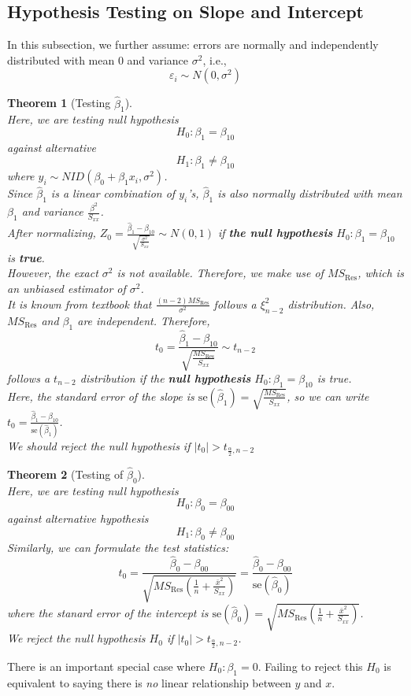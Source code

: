 \documentclass[12pt]{article}
\newcommand{\se}{\mathrm{se}}
\newtheorem{theorem}{Theorem}[section]
\theoremstyle{definition}
\begin{document}
\subsection{Hypothesis Testing on Slope and Intercept}
In this subsection, we further assume: errors are normally and independently distributed with mean $0$ and variance $\sigma^2$, i.e.,
\[
\varepsilon_i\sim N(0,\sigma^2)
\]
\begin{theorem}[Testing {$\hat{\beta}_1$}]
\hfill\\\normalfont Here, we are testing null hypothesis
\[
H_0:\beta_1= \beta_{10}
\]
against alternative
\[
H_1: \beta_1\neq \beta_{10}
\]
where $y_i\sim NID(\beta_0 + \beta_1x_i, \sigma^2)$.\\
Since $\hat{\beta}_1$ is a linear combination of $y_i$'s, $\hat{\beta}_1$ is also normally distributed with mean $\beta_1$ and variance $\frac{\beta^2}{S_{xx}}$.\\ After normalizing, $Z_0 = \frac{\hat{\beta}_1-\beta_{10}}{\sqrt{\frac{\sigma^2}{S_{xx}}}}\sim N(0,1)$ if \textbf{the null hypothesis} $H_0:\beta_1 = \beta_{10}$ is \textbf{true}.\\

However, the exact $\sigma^2$ is not available. Therefore, we make use of $MS_\text{Res}$, which is an unbiased estimator of $\sigma^2$.\\
It is known \textit{from textbook} that $\frac{(n-2)MS_\text{Res}}{\sigma^2}$ follows a $\xi_{n-2}^2$ distribution. Also, $MS_\text{Res}$ and $\beta_1$ are independent. Therefore,
\[
t_0=\frac{\hat{\beta}_1-\beta_{10}}{\sqrt{\frac{MS_\text{Res}}{S_{xx}}}}\sim t_{n-2}
\]
follows a $t_{n-2}$ distribution if the \textbf{null hypothesis} $H_0: \beta_1 = \beta_{10}$ is true.\\
Here, the standard error of the slope is $\se(\hat{\beta}_1)=\sqrt{\frac{MS_\text{Res}}{S_{xx}}}$, so we can write $t_0 = \frac{\hat{\beta}_1-\beta_{10}}{\se(\hat{\beta}_1)}$.\\
We should reject the null hypothesis if $|t_0|> t_{\frac{\alpha}{2}, n-2}$
\end{theorem}
\begin{theorem}[Testing of {$\hat{\beta}_0$}]
\hfill\\\normalfont Here, we are testing null hypothesis 
\[
H_0: \beta_0 = \beta_{00}
\]
against alternative hypothesis
\[
H_1: \beta_0 \neq \beta_{00}
\]
Similarly, we can formulate the test statistics:
\[
t_0 = \frac{\hat{\beta}_0-\beta_{00}}{\sqrt{MS_\text{Res}(\frac{1}{n}+\frac{\bar{x}^2}{S_{xx}})}} = \frac{\hat{\beta}_0-\beta_{00}}{\se(\hat{\beta}_0)}
\]
where the stanard error of the intercept is $\se(\hat{\beta}_0) = \sqrt{MS_\text{Res}(\frac{1}{n}+\frac{\bar{x}^2}{S_{xx}})}$.\\
We reject the null hypothesis $H_0$ if $|t_0|> t_{\frac{\alpha}{2}, n-2}$.
\end{theorem}
There is an important special case where $H_0: \beta_1 = 0$. Failing to reject this $H_0$ is equivalent to saying there is \textit{no} linear relationship between $y$ and $x$.
\end{document}
